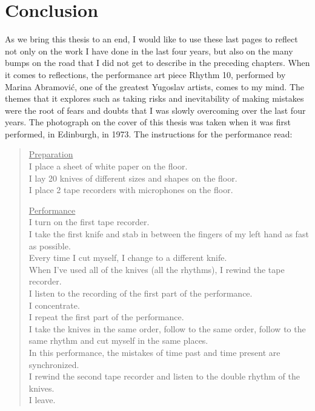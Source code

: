 \chapter{Conclusion}
\label{ch:conclusion}
 
As we bring this thesis to an end, I would like to use these last pages to
reflect not only on the work I have done in the last four years, but also on the
many bumps on the road that I did not get to describe in the preceding chapters.
When it comes to reflections, the  performance art piece Rhythm 10, performed by
Marina Abramovi\'c,  one of the greatest Yugoslav artists, comes to my mind. The
themes that it explores such as taking risks and inevitability of making
mistakes were the root of fears and doubts that I was slowly overcoming over the
last four years. The photograph on the cover of this thesis was taken when it
was first performed, in Edinburgh, in 1973. The instructions for the performance read:

\begin{quote}
    \underline{Preparation} \\[1\jot]
    I place a sheet of white paper on the floor.\\
    I lay 20 knives of different sizes and shapes on the floor.\\
    I place 2 tape recorders with microphones on the floor.
    
    \underline{Performance} \\[1\jot]
    I turn on the first tape recorder.\\
    I take the first knife and stab in between the fingers of my left hand as
    fast as possible.\\
    Every time I cut myself, I change to a different knife. \\
    When I've used all of the knives (all the rhythms), I rewind the tape
    recorder. \\ 
    I listen to the recording of the first part of the performance. \\ I
    concentrate. \\
    I repeat the first part of the performance. \\
    I take the knives in the same order, follow to the same order, follow to the
    same rhythm and cut myself in the same places. \\
    In this performance, the mistakes of time past and time present are
    synchronized.\\
    I rewind the second tape recorder and listen to the double rhythm of the
    knives.\\
    I leave.
\end{quote}


